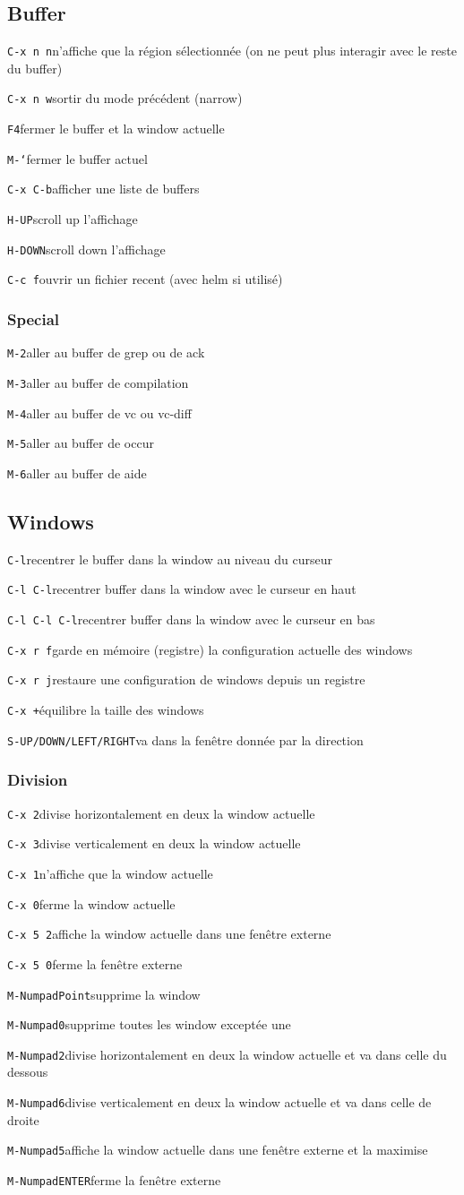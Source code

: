 \documentclass[10pt,landscape]{article}
\def\cm#1#2{{\tt#1}\dotfill#2\par}
\begin{document}
\begin{multicols}{3}
\subsection{Buffer}
\cm{C-x n n}{n'affiche que la région sélectionnée (on ne peut plus interagir avec le reste du buffer)}
\cm{C-x n w}{sortir du mode précédent (narrow)}
\cm{F4}{fermer le buffer et la window actuelle}
\cm{M-`}{fermer le buffer actuel}
\cm{C-x C-b}{afficher une liste de buffers}
\cm{H-UP}{scroll up l'affichage}
\cm{H-DOWN}{scroll down l'affichage}
\cm{C-c f}{ouvrir un fichier recent (avec helm si utilisé)}

\subsubsection{Special}
\cm{M-2}{aller au buffer de grep ou de ack}
\cm{M-3}{aller au buffer de compilation}
\cm{M-4}{aller au buffer de vc ou vc-diff}
\cm{M-5}{aller au buffer de occur}
\cm{M-6}{aller au buffer de aide}





\subsection{Windows}
\cm{C-l}{recentrer le buffer dans la window au niveau du curseur}
\cm{C-l C-l}{recentrer buffer dans la window avec le curseur en haut}
\cm{C-l C-l C-l}{recentrer buffer dans la window avec le curseur en bas}
\cm{C-x r f}{garde en mémoire (registre) la configuration actuelle des windows}
\cm{C-x r j}{restaure une configuration de windows depuis un registre}
\cm{C-x +}{équilibre la taille des windows}
\cm{S-UP/DOWN/LEFT/RIGHT}{va dans la fenêtre donnée par la direction}

\subsubsection{Division}
\cm{C-x 2}{divise horizontalement en deux la window actuelle}
\cm{C-x 3}{divise verticalement en deux la window actuelle}
\cm{C-x 1}{n'affiche que la window actuelle}
\cm{C-x 0}{ferme la window actuelle}
\cm{C-x 5 2}{affiche la window actuelle dans une fenêtre externe}
\cm{C-x 5 0}{ferme la fenêtre externe}
\cm{M-NumpadPoint}{supprime la window}
\cm{M-Numpad0}{supprime toutes les window exceptée une}
\cm{M-Numpad2}{divise horizontalement en deux la window actuelle et va dans celle du dessous}
\cm{M-Numpad6}{divise verticalement en deux la window actuelle et va dans celle de droite}
\cm{M-Numpad5}{affiche la window actuelle dans une fenêtre externe et la maximise}
\cm{M-NumpadENTER}{ferme la fenêtre externe}


\end{multicols}
\end{document}
